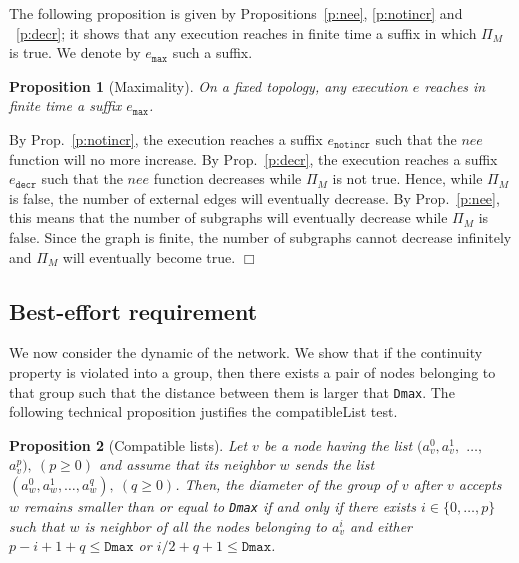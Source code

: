 \documentclass[11pt,english]{article}
\newtheorem{proposition}{Proposition}
\newenvironment{proof}[1][0cm]{
  \begin{list}{\bf Proof.~}{
      \setlength{\itemindent}{0cm}
      \setlength{\labelsep}{0cm}
      \setlength{\labelwidth}{#1}
      \setlength{\leftmargin}{#1}
    \item
    }
}{\hfill$\Box$
  \end{list}
}
\begin{document}
The following proposition is given by Propositions~\ref{p:nee}, \ref{p:notincr}
and ~\ref{p:decr}; it shows that any execution reaches in finite time a suffix
in which $\Pi_M$ is true. We denote by $e_\texttt{max}$ such a suffix.

\begin{proposition}[Maximality]\label{p:max}
  On a fixed topology, any execution $e$ reaches in finite time a suffix
  $e_\texttt{max}$.
\end{proposition}

\begin{proof}
  By Prop.~\ref{p:notincr}, the execution reaches a suffix $e_\texttt{notincr}$
  such that the $nee$ function will no more increase.  By Prop.~\ref{p:decr},
  the execution reaches a suffix $e_\texttt{decr}$ such that the $nee$ function
  decreases while $\Pi_M$ is not true.  Hence, while $\Pi_M$ is false, the
  number of external edges will eventually decrease. By Prop.~\ref{p:nee}, this
  means that the number of subgraphs will eventually decrease while $\Pi_M$ is
  false. Since the graph is finite, the number of subgraphs cannot decrease
  infinitely and $\Pi_M$ will eventually become true.
\end{proof}


\subsection{Best-effort requirement}

We now consider the dynamic of the network.  We show that if the continuity
property is violated into a group, then there exists a pair of nodes belonging
to that group such that the distance between them is larger that
\texttt{Dmax}. The following technical proposition justifies the compatibleList
test.

\begin{proposition}[Compatible lists]\label{p:compatible}
Let $v$ be a node having the list $(a_v^0,a_v^1,$ $\ldots,$ $a_v^p),\ (p\geq 0)$ and assume
that its neighbor $w$ sends the list $(a_w^0,a_w^1, \ldots, a_w^q),\ (q\geq 0)$.
Then, the diameter of the group of $v$ after $v$ accepts $w$ remains smaller than or equal to
\texttt{Dmax} if and only if there exists $i \in
\{0,\ldots,p\}$ such that $w$ is neighbor of all the nodes belonging to $a_v^i$
and either $p-i+1+q \leq \texttt{Dmax}$ or $i/2+q+1 \leq \texttt{Dmax}$.
\end{proposition}
\end{document}
